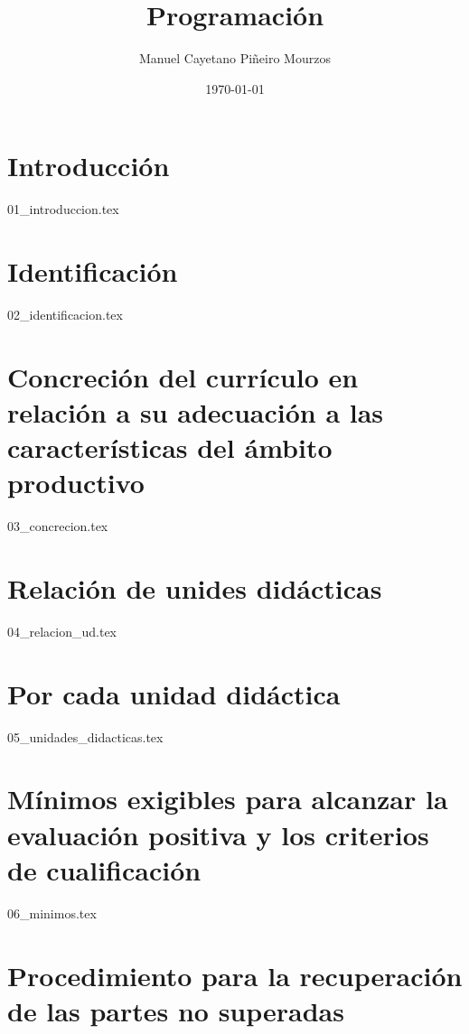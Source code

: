 \documentclass[a4paper,oneside,titlepage,12pt]{article}
\title{Programación}
\author{Manuel Cayetano Piñeiro Mourzos}
\date{\today}
\begin{document}
\maketitle
\tableofcontents

\newpage

\maketitle

\tableofcontents

\section{Introducción}

{01_introduccion.tex}

\section{Identificación}

{02_identificacion.tex}

\section{Concreción del currículo en relación a su adecuación a las características del ámbito productivo}

{03_concrecion.tex}

\section{Relación de unides didácticas}

{04_relacion_ud.tex}

\section{Por cada unidad didáctica}

{05_unidades_didacticas.tex}

\section{Mínimos exigibles para alcanzar la evaluación positiva y los criterios de cualificación}

{06_minimos.tex}

\section{Procedimiento para la recuperación de las partes no superadas}
\end{document}
